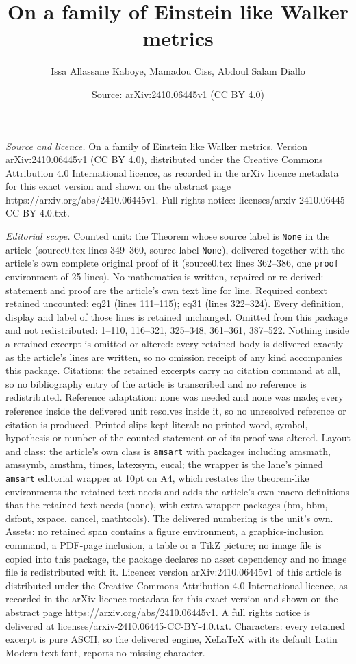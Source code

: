 \documentclass[10pt,a4paper]{amsart}
\title[On a family of Einstein like Walker metrics]{On a family of Einstein like Walker metrics}
\author{Issa Allassane Kaboye, Mamadou Ciss, Abdoul Salam Diallo}
\date{Source: arXiv:2410.06445v1 (CC BY 4.0)}
\begin{document}
\maketitle

\noindent\emph{Source and licence.} On a family of Einstein like Walker metrics. Version arXiv:2410.06445v1 (CC BY 4.0), distributed under the Creative Commons Attribution 4.0 International licence, as recorded in the arXiv licence metadata for this exact version and shown on the abstract page https://arxiv.org/abs/2410.06445v1. Full rights notice: licenses/arxiv-2410.06445-CC-BY-4.0.txt.\par\smallskip

\noindent\textit{Editorial scope.} Counted unit: the Theorem whose source label is \texttt{None} in the article (source0.tex lines 349--360, source label \texttt{None}), delivered together with the article's own complete original proof of it (source0.tex lines 362--386, one \texttt{proof} environment of 25 lines). No mathematics is written, repaired or re-derived: statement and proof are the article's own text line for line. Required context retained uncounted: eq21 (lines 111--115); eq31 (lines 322--324). Every definition, display and label of those lines is retained unchanged. Omitted from this package and not redistributed: 1--110, 116--321, 325--348, 361--361, 387--522. Nothing inside a retained excerpt is omitted or altered: every retained body is delivered exactly as the article's lines are written, so no omission receipt of any kind accompanies this package. Citations: the retained excerpts carry no citation command at all, so no bibliography entry of the article is transcribed and no reference is redistributed. Reference adaptation: none was needed and none was made; every reference inside the delivered unit resolves inside it, so no unresolved reference or citation is produced. Printed slips kept literal: no printed word, symbol, hypothesis or number of the counted statement or of its proof was altered. Layout and class: the article's own class is \texttt{amsart} with packages including amsmath, amssymb, amsthm, times, latexsym, eucal; the wrapper is the lane's pinned \texttt{amsart} editorial wrapper at 10pt on A4, which restates the theorem-like environments the retained text needs and adds the article's own macro definitions that the retained text needs (none), with extra wrapper packages (bm, bbm, dsfont, xspace, cancel, mathtools). The delivered numbering is the unit's own. Assets: no retained span contains a figure environment, a graphics-inclusion command, a PDF-page inclusion, a table or a TikZ picture; no image file is copied into this package, the package declares no asset dependency and no image file is redistributed with it. Licence: version arXiv:2410.06445v1 of this article is distributed under the Creative Commons Attribution 4.0 International licence, as recorded in the arXiv licence metadata for this exact version and shown on the abstract page https://arxiv.org/abs/2410.06445v1. A full rights notice is delivered at licenses/arxiv-2410.06445-CC-BY-4.0.txt. Characters: every retained excerpt is pure ASCII, so the delivered engine, XeLaTeX with its default Latin Modern text font, reports no missing character.
\end{document}
